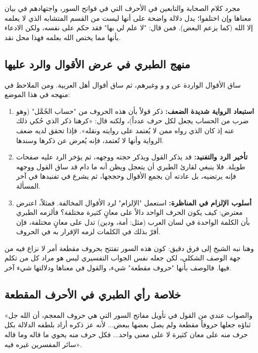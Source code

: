 \begin{fawaid}
مجرد كلام الصحابة والتابعين في الأحرف التي في فواتح السور، واجتهادهم في بيان معناها وإن اختلفوا؛ يدل دلالة واضحة على أنها ليست من القسم المتشابه الذي لا يعلمه إلا الله (كما يزعم البعض). فمن قال: "لا علم لي بها" فقد حكم على نفسه، ولكن الادعاء بأنها مما يختص الله بعلمه فهذا محل نقد.
\end{fawaid}

\subsection{منهج الطبري في عرض الأقوال والرد عليها}
ساق  الأقوال الواردة عن  و و وغيرهم، ثم ساق أقوال أهل العربية. ومن الملاحظ في منهجه في هذا الموضع:

\begin{enumerate}
    \item \textbf{استبعاد الرواية شديدة الضعف:} ذكر  قولاً بأن هذه الحروف من "حساب الجُمَّل" (وهو ضرب من الحساب يجعل لكل حرف عدداً)، ولكنه قال: «كرهنا ذكر الذي حُكي ذلك عنه إذ كان الذي رواه ممن لا يُعتمد على روايته ونقله». فإذا تحقق لديه ضعف الرواية وأنها لا تُعتمد، فإنه يُعرض عن ذكرها وسندها.
    \item \textbf{تأخير الرد والتفنيد:} قد يذكر  القول ويذكر حجته ووجهه، ثم يؤخر الرد عليه صفحات طويلة. فلا ينبغي لقارئ الطبري أن يتعجل ويظن أنه ما دام قد ساق القول ووجهه فإنه يرتضيه، بل عادته أن يجمع الأقوال وحججها، ثم يشرع في تفنيدها في آخر المسألة.
    \item \textbf{أسلوب الإلزام في المناظرة:} استعمل  "الإلزام" لرد الأقوال المخالفة. فمثلاً، اعترض معترض: كيف يكون الحرف الواحد دالاً على معانٍ كثيرة مختلفة؟ فألزمه الطبري بأن الكلمة الواحدة في لسان العرب (مثل: أمة، ودين) تدل على معانٍ مختلفة، فإن أقرّ بذلك في الكلمات لزمه الإقرار به في الحروف.
\end{enumerate}

وهنا نبه الشيخ إلى فرق دقيق: كون هذه السور تفتتح بحروف مقطعة أمر لا نزاع فيه من جهة الوصف الشكلي، لكن جعله نفس الجواب التفسيري ليس هو مراد كل من تكلم فيها. فالوصف بأنها "حروف مقطعة" شيء، والقول في معناها ودلالتها شيء آخر.

\subsection{خلاصة رأي الطبري في الأحرف المقطعة}
 «والصواب عندي من القول في تأويل مفاتح السور التي هي حروف المعجم، أن الله جل ثناؤه جعلها حروفاً مقطعة ولم يصل بعضها ببعض... لأنه عز ذكره أراد بلطفه الدلالة بكل حرف منه على معان كثيرة لا على معنى واحد... فكل حرف منه يحوي ما قاله  وما قاله سائر المفسرين غيره فيه».

